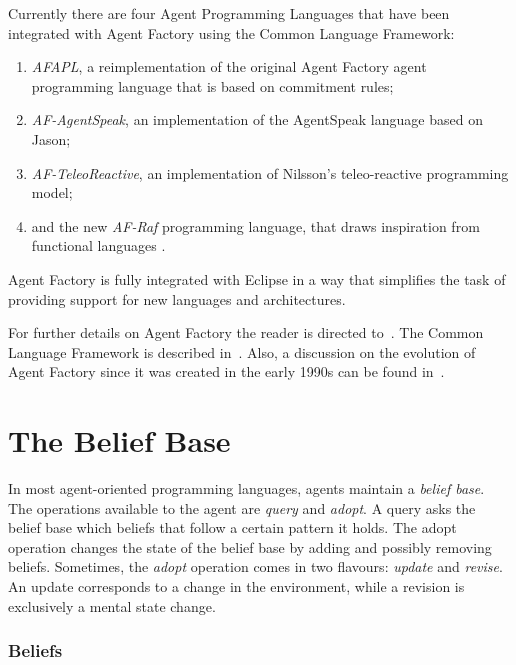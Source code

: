 \documentclass[a4paper,12pt,oneside,fleqn]{book} %
\begin{document}
Currently there are four Agent Programming Languages that have been
integrated with Agent Factory using the Common Language Framework:
\begin{enumerate}

\item \textit{AFAPL}, a reimplementation of the original Agent Factory
agent programming language that is based on commitment rules;

\item \textit{AF-AgentSpeak}, an implementation of the AgentSpeak language based on Jason;

\item \textit{AF-TeleoReactive}, an implementation of Nilsson's teleo-reactive
programming model;

\item and the new \textit{AF-Raf} programming language, that draws
inspiration from functional languages .
\end{enumerate}

Agent Factory is fully integrated with Eclipse in a way that simplifies
the task of providing support for new languages and architectures.

For further details on Agent Factory the reader is directed
to~\cite{collier2009modeling}. The Common Language Framework is described
in~\cite{russell2011af}. Also, a discussion on the evolution of Agent Factory since it
was created in the early 1990s can be found in~\cite{muldoon2009towards}.


\section{The Belief Base} %

In most agent-oriented programming languages, agents maintain a
\emph{belief base}.  The operations available to the agent are
\textit{query} and \textit{adopt}.  A query asks the belief base which
beliefs that follow a certain pattern it holds.  The adopt operation
changes the state of the belief base by adding and possibly removing
beliefs.  Sometimes, the {\it adopt\/} operation comes in two flavours:
{\it update\/} and {\it revise}.  An update corresponds to a change in the
environment, while a revision is exclusively a mental state change.

\subsubsection{Beliefs}
\end{document}
